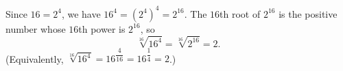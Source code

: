 Since $16=2^4$, we have $16^4=\left(2^4\right)^4=2^{16}$. The $16$th root of $2^{16}$ is the positive number whose $16$th power is $2^{16}$, so
\[
\sqrt[16]{16^4}=\sqrt[16]{2^{16}}=\boxed{2}.
\]
(Equivalently, $\sqrt[16]{16^4}=16^{\dfrac{4}{16}}=16^{\dfrac{1}{4}}=2$.)

